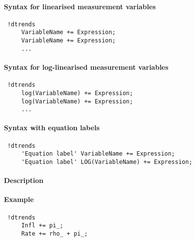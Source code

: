 


	\paragraph{Syntax for linearised measurement variables}
 
 \begin{verbatim}
 !dtrends
     VariableName += Expression;
     VariableName += Expression;
     ...
 \end{verbatim}
 
 \paragraph{Syntax for log-linearised measurement variables}
 
 \begin{verbatim}
 !dtrends
     log(VariableName) += Expression;
     log(VariableName) += Expression;
     ...
 \end{verbatim}
 
 \paragraph{Syntax with equation labels}
 
 \begin{verbatim}
 !dtrends
     'Equation label' VariableName += Expression;
     'Equation label' LOG(VariableName) += Expression;
 \end{verbatim}
 
 \paragraph{Description}
 
 \paragraph{Example}
 
 \begin{verbatim}
 !dtrends
     Infl += pi_;
     Rate += rho_ + pi_;
 \end{verbatim}


